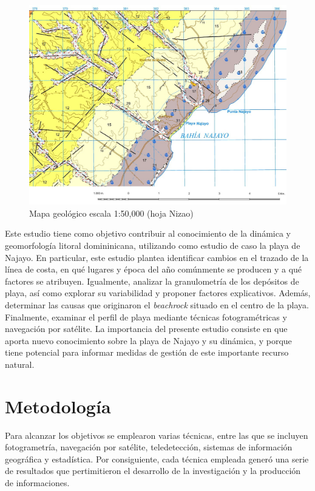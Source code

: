 \documentclass[11pt,]{article}
\begin{document}
\begin{figure}
\centering
\includegraphics{mapa_bahia_najayo.jpg}
\caption{Mapa geológico escala 1:50,000 (hoja Nizao)\label{mapageo50k}}
\end{figure}

Este estudio tiene como objetivo contribuir al conocimiento de la
dinámica y geomorfología litoral domininicana, utilizando como estudio
de caso la playa de Najayo. En particular, este estudio plantea
identificar cambios en el trazado de la línea de costa, en qué lugares y
época del año comúnmente se producen y a qué factores se atribuyen.
Igualmente, analizar la granulometría de los depósitos de playa, así
como explorar su variabilidad y proponer factores explicativos. Además,
determinar las causas que originaron el \emph{beachrock} situado en el
centro de la playa. Finalmente, examinar el perfil de playa mediante
técnicas fotogramétricas y navegación por satélite. La importancia del
presente estudio consiste en que aporta nuevo conocimiento sobre la
playa de Najayo y su dinámica, y porque tiene potencial para informar
medidas de gestión de este importante recurso natural.

\section{Metodología}\label{metodologuxeda}

Para alcanzar los objetivos se emplearon varias técnicas, entre las que
se incluyen fotogrametría, navegación por satélite, teledetección,
sistemas de información geográfica y estadística. Por consiguiente, cada
técnica empleada generó una serie de resultados que pertimitieron el
desarrollo de la investigación y la producción de informaciones.
\end{document}
